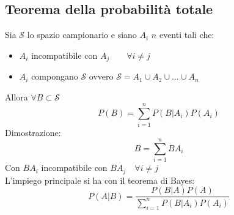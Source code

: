 \documentclass[11pt,a4paper]{book}
\begin{document}
\subsection{Teorema della probabilità totale} 
Sia $ \mathcal{S} $ lo spazio campionario e siano $  {A_i} $ $ n $ eventi tali che:
\begin{itemize}
\item $ A_i $ incompatibile con $ A_j \qquad \forall i \neq j $
\item $ {A_i} $ compongano $ \mathcal{S} $ ovvero $ \mathcal{S} = A_1 \cup A_2 \cup \dots \cup A_n$
\end{itemize}
Allora  $ \forall B \subset \mathcal{S} $
\begin{equation}
P(B) = \sum\limits_{i = 1}^{n}P(B|A_i)P(A_i)
\end{equation}
Dimostrazione:
\begin{equation}
B = \sum\limits_{i = 1}^{n} BA_i 
\end{equation}
Con $ BA_i $ incompatibile con $ BA_j \quad \forall i \neq j$\\
L'impiego principale si ha con il teorema di Bayes:
\begin{equation}
P(A|B) = \frac{P(B|A)P(A)}{\sum\limits_{i = 1}^{n}P(B|A_i)P(A_i)}
\end{equation}
\end{document}
